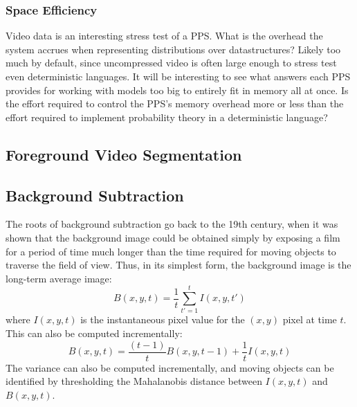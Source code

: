 \subsubsection{Space Efficiency}

Video data is an interesting stress test of a PPS.  What is the
overhead the system accrues when representing distributions over
datastructures?  Likely too much by default, since uncompressed video is often large
enough to stress test even deterministic languages.  It will be
interesting to see what answers each PPS provides for working with
models too big to entirely fit in memory all at once.  Is the effort
required to control the PPS's memory overhead more or less than the
effort required to implement probability theory in a deterministic
language?










\subsection{Foreground Video Segmentation}
\label{sec:formal-problem}



\subsection{Background Subtraction}
\label{background-subtraction-section}

The roots of background subtraction go back to the 19th century, when
it was shown that the background image could be obtained simply by
exposing a film for a period of time much longer than the time
required for moving objects to traverse the field of view. Thus, in
its simplest form, the background image is the long-term average
image:
\[ B(x,y,t) = \frac{1}{t}\sum_{t'=1}^t I(x,y,t') \]
where $I(x,y,t)$ is the instantaneous pixel value for the $(x,y)$
pixel at time $t$. This can also be computed incrementally:
\[B(x,y,t) = \frac{(t-1)}{t}B(x,y,t-1) + \frac{1}{t}I(x,y,t)\]
The variance can also be computed incrementally, and moving
objects can be identified by thresholding the Mahalanobis distance
between $I(x,y,t)$ and $B(x,y,t)$.

